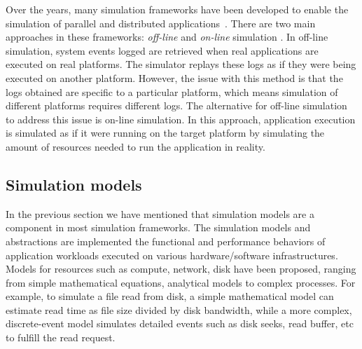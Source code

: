 Over the years, many simulation frameworks have been developed to enable 
the simulation of parallel and distributed 
applications~\cite{optorsim, gridsim, groudsim, cloudsim,
nunez2012simcan,nunez2012icancloud, mdcsim, dissect_cf,
cloudnetsimplusplus, fognetsimplusplus, casanova2014simgrid,
ROSS, casanova2020fgcs}. 
There are two main approaches in these frameworks: \textit{off-line} and 
\textit{on-line} simulation \cite{casanova2014simgrid}. 
In off-line simulation, system events logged  are retrieved 
when real applications are executed on real platforms.
The simulator replays these logs as if they were being executed 
on another platform. 
However, the issue with this method is that the logs obtained are specific to 
a particular platform, which means simulation of different platforms 
requires different logs.
The alternative for off-line simulation to address this issue is 
on-line simulation.
In this approach, application execution is simulated as if it were running 
on the target platform by simulating the amount of resources needed 
to run the application in reality. 

\subsection{Simulation models}

In the previous section  we have mentioned that simulation models are 
a component in most simulation frameworks.
The simulation models and abstractions are implemented  the functional and performance 
behaviors of application workloads executed on various 
hardware/software infrastructures. 
Models for resources such as compute, network, disk have been proposed, 
ranging from simple mathematical equations, analytical models 
to complex processes.
For example, to simulate a file read from disk, a simple mathematical model 
can estimate read time as file size divided by disk bandwidth, 
while a more complex, discrete-event model simulates detailed events 
such as disk seeks, read buffer, etc to fulfill the read request.

